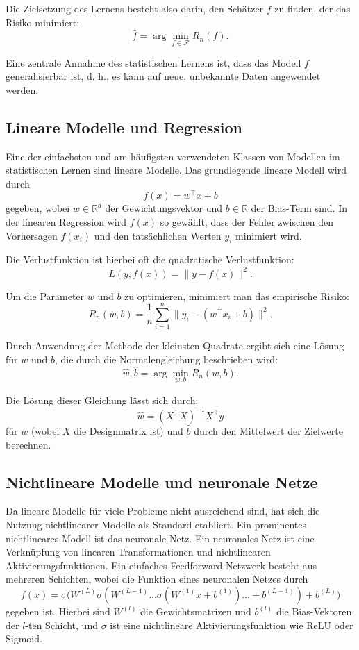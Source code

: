 Die Zielsetzung des Lernens besteht also darin, den Schätzer $f$ zu finden, der das Risiko minimiert:
\[
\hat{f} = \arg \min_{f \in \mathcal{F}} R_n(f).
\]

Eine zentrale Annahme des statistischen Lernens ist, dass das Modell $f$ generalisierbar ist, d. h., es kann auf neue, unbekannte Daten angewendet werden.

\subsection{Lineare Modelle und Regression}
Eine der einfachsten und am häufigsten verwendeten Klassen von Modellen im statistischen Lernen sind lineare Modelle. Das grundlegende lineare Modell wird durch
\[
f(x) = w^\top x + b
\]
gegeben, wobei $w \in \mathbb{R}^d$ der Gewichtungsvektor und $b \in \mathbb{R}$ der Bias-Term sind. In der linearen Regression wird $f(x)$ so gewählt, dass der Fehler zwischen den Vorhersagen $f(x_i)$ und den tatsächlichen Werten $y_i$ minimiert wird.

Die Verlustfunktion ist hierbei oft die quadratische Verlustfunktion:
\[
L(y, f(x)) = \|y - f(x)\|^2.
\]

Um die Parameter $w$ und $b$ zu optimieren, minimiert man das empirische Risiko:
\[
R_n(w, b) = \frac{1}{n} \sum_{i=1}^n \|y_i - (w^\top x_i + b)\|^2.
\]

Durch Anwendung der Methode der kleinsten Quadrate ergibt sich eine Lösung für $w$ und $b$, die durch die Normalengleichung beschrieben wird:
\[
\hat{w}, \hat{b} = \arg \min_{w, b} R_n(w, b).
\]

Die Lösung dieser Gleichung lässt sich durch:
\[
\hat{w} = (X^\top X)^{-1} X^\top y
\]
für $w$ (wobei $X$ die Designmatrix ist) und $\hat{b}$ durch den Mittelwert der Zielwerte berechnen.

\subsection{Nichtlineare Modelle und neuronale Netze}
Da lineare Modelle für viele Probleme nicht ausreichend sind, hat sich die Nutzung nichtlinearer Modelle als Standard etabliert. Ein prominentes nichtlineares Modell ist das neuronale Netz. Ein neuronales Netz ist eine Verknüpfung von linearen Transformationen und nichtlinearen Aktivierungsfunktionen. Ein einfaches Feedforward-Netzwerk besteht aus mehreren Schichten, wobei die Funktion eines neuronalen Netzes durch
\[
f(x) = \sigma\big(W^{(L)} \sigma(W^{(L-1)} \dots \sigma(W^{(1)} x + b^{(1)}) \dots + b^{(L-1)}) + b^{(L)}\big)
\]
gegeben ist. Hierbei sind $W^{(l)}$ die Gewichtsmatrizen und $b^{(l)}$ die Bias-Vektoren der $l$-ten Schicht, und $\sigma$ ist eine nichtlineare Aktivierungsfunktion wie ReLU oder Sigmoid.

